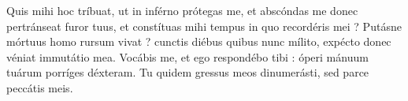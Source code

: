 \lettrine{Q}{}uis mihi hoc tríbuat, ut in inférno prótegas me, et abscóndas me donec pertránseat furor tuus, et constítuas mihi tempus in quo recordéris mei ?
Putásne mórtuus homo rursum vivat ? cunctis diébus quibus nunc mílito, expécto donec véniat immutátio mea.
Vocábis me, et ego respondébo tibi : óperi mánuum tuárum porríges déxteram.
Tu quidem gressus meos dinumerásti, sed parce peccátis meis.